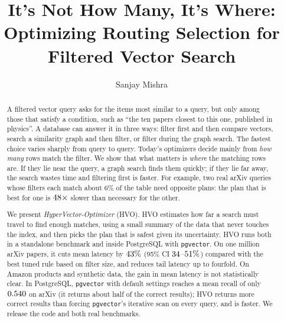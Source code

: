 \documentclass[sigconf,nonacm]{acmart}
\begin{document}
\title[It's Not How Many, It's Where]{It's Not How Many, It's Where: Optimizing Routing Selection for Filtered Vector Search}

\author{Sanjay Mishra}



\begin{abstract}
A filtered vector query asks for the items most similar to a query, but only among those that satisfy a condition, such as ``the ten papers closest to this one, published in physics''. A database can answer it in three ways: filter first and then compare vectors, search a similarity graph and then filter, or filter during the graph search. The fastest choice varies sharply from query to query. Today's optimizers decide mainly from \emph{how many} rows match the filter. We show that what matters is \emph{where} the matching rows are. If they lie near the query, a graph search finds them quickly; if they lie far away, the search wastes time and filtering first is faster. For example, two real arXiv queries whose filters each match about $6\%$ of the table need opposite plans: the plan that is best for one is $48\times$ slower than necessary for the other.

We present \emph{HyperVector-Optimizer} (HVO). HVO estimates how far a search must travel to find enough matches, using a small summary of the data that never touches the index, and then picks the plan that is safest given its uncertainty. HVO runs both in a standalone benchmark and inside PostgreSQL with \texttt{pgvector}. On one million arXiv papers, it cuts mean latency by $43\%$ (95\% CI $34$--$51\%$) compared with the best tuned rule based on filter size, and reduces tail latency up to fourfold. On Amazon products and synthetic data, the gain in mean latency is not statistically clear. In PostgreSQL, \texttt{pgvector} with default settings reaches a mean recall of only $0.540$ on arXiv (it returns about half of the correct results); HVO returns more correct results than forcing \texttt{pgvector}'s iterative scan on every query, and is faster. We release the code and both real benchmarks.
\end{abstract}

\end{document}

